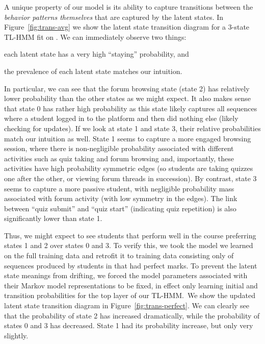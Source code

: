 A unique property of our model is its ability to capture transitions
between the \emph{behavior patterns themselves} that are captured by the
latent states. In Figure~\ref{fig:trans-avg} we show the latent state
transition diagram for a 3-state TL-HMM fit on \textretrieval{}. We can
immediately observe two things: \begin{enumerate*}[label=(\arabic*)]
  \item each latent state has a very high ``staying'' probability, and
  \item the prevalence of each latent state matches our intuition.
\end{enumerate*}
In particular, we can see that the forum browsing state (state 2) has
relatively lower probability than the other states as we might expect. It
also makes sense that state 0 has rather high probability as this state
likely captures all sequences where a student logged in to the platform and
then did nothing else (likely checking for updates). If we look at state 1
and state 3, their relative probabilities match our intuition as
well. State 1 seems to capture a more engaged browsing session, where there
is non-negligible probability associated with different activities such as
quiz taking and forum browsing and, importantly, these activities have high
probability symmetric edges (so students are taking quizzes one after the
other, or viewing forum threads in succession). By contrast, state 3 seems
to capture a more passive student, with negligible probability mass
associated with forum activity (with low symmetry in the edges). The link
between ``quiz submit'' and ``quiz start'' (indicating quiz repetition) is
also significantly lower than state 1.

Thus, we might expect to see students that perform well in the course
preferring states 1 and 2 over states 0 and 3. To verify this, we took the
model we learned on the full training data and retrofit it to training data
consisting only of sequences produced by students in \textretrieval{} that
had perfect marks. To prevent the latent state meanings from drifting, we
forced the model parameters associated with their Markov model
representations to be fixed, in effect only learning initial and transition
probabilities for the top layer of our TL-HMM.\ We show the updated latent
state transition diagram in Figure~\ref{fig:trans-perfect}. We can clearly
see that the probability of state 2 has increased dramatically, while the
probability of states 0 and 3 has decreased. State 1 had its probability
increase, but only very slightly.
